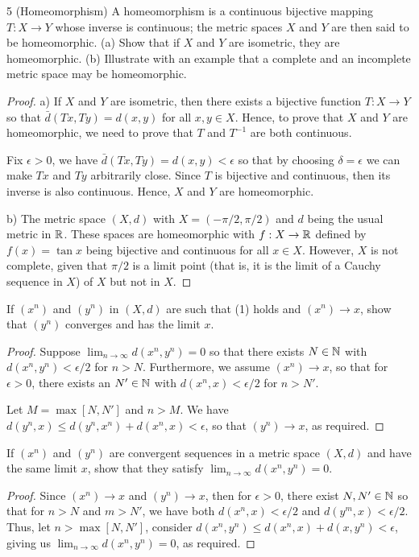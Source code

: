 \begin{exercise}{5 (Homeomorphism)}
A homeomorphism is a continuous bijective mapping $T:X\to Y$ whose inverse is continuous; the metric spaces $X$ and $Y$ are then said to be homeomorphic. (a) Show that if $X$ and $Y$ are isometric, they are homeomorphic. (b) Illustrate with an example that a complete and an incomplete metric space may be homeomorphic.
\end{exercise}
\begin{proof}
a) If $X$ and $Y$ are isometric, then there exists a bijective function $T:X\to Y$ so that $\bar{d}(Tx,Ty)=d(x,y)$ for all $x,y\in X$. Hence, to prove that $X$ and $Y$ are homeomorphic, we need to prove that $T$ and $T^{-1}$ are both continuous. 

Fix $\epsilon>0$, we have $\bar{d}(Tx,Ty)=d(x,y)<\epsilon$ so that by choosing $\delta=\epsilon$ we can make $Tx$ and $Ty$ arbitrarily close. Since $T$ is bijective and continuous, then its inverse is also continuous. Hence, $X$ and $Y$ are homeomorphic.

b) The metric space $(X,d)$ with $X=(-\pi/2,\pi/2)$ and $d$ being the usual metric in $\mathbb{R}$. These spaces are homeomorphic with $f:X\to\mathbb{R}$ defined by $f(x)=\tan x$ being bijective and continuous for all $x\in X$. However, $X$ is not complete, given that $\pi/2$ is a limit point (that is, it is the limit of a Cauchy sequence in $X$) of $X$ but not in $X$.
\end{proof}

\begin{exercise}{9}
If $(x^n)$ and $(y^n)$ in $(X,d)$ are such that (1) holds and $(x^n)\to x$, show that $(y^n)$ converges and has the limit $x$.
\end{exercise}
\begin{proof}
Suppose $\lim_{n\to\infty}d(x^n,y^n)=0$ so that there exists $N\in\mathbb{N}$ with $d(x^n,y^n)<\epsilon/2$ for $n>N$. Furthermore, we assume $(x^n)\to x$, so that for $\epsilon>0$, there exists an $N'\in\mathbb{N}$ with $d(x^n,x)<\epsilon/2$ for $n>N'$. 

Let $M=\max[N,N']$ and $n>M$. We have $d(y^n, x)\leq d(y^n,x^n)+d(x^n,x)<\epsilon$, so that $(y^n)\to x$, as required.
\end{proof}

\begin{exercise}{10}
If $(x^n)$ and $(y^n)$ are convergent sequences in a metric space $(X,d)$ and have the same limit $x$, show that they satisfy $\lim_{n\to\infty}d(x^n,y^n)=0$.
\end{exercise}
\begin{proof}
Since $(x^n)\to x$ and $(y^n)\to x$, then for $\epsilon>0$, there exist $N,N'\in\mathbb{N}$ so that for $n>N$ and $m>N'$, we have both $d(x^n,x)<\epsilon/2$ and $d(y^m,x)<\epsilon/2$. Thus, let $n>\max[N,N']$, consider $d(x^n,y^n)\leq d(x^n,x)+d(x,y^n)<\epsilon$, giving us $\lim_{n\to\infty}d(x^n,y^n)=0$, as required.
\end{proof}

